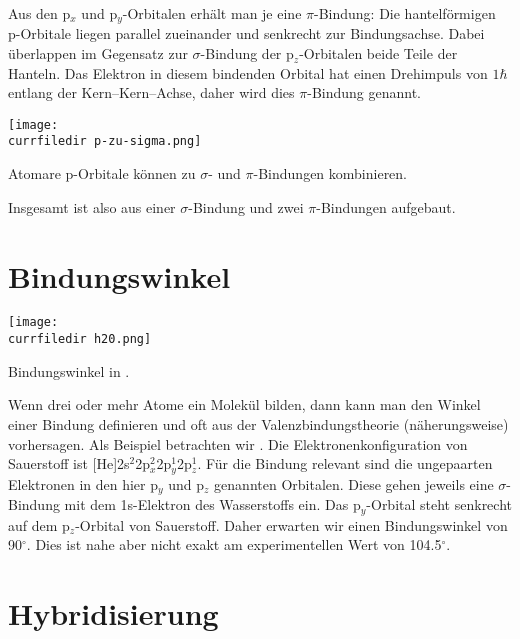 Aus den p$_x$ und p$_y$-Orbitalen erhält man je eine $\pi$-Bindung: Die hantelförmigen p-Orbitale liegen parallel zueinander und senkrecht zur Bindungsachse. Dabei überlappen im Gegensatz zur $\sigma$-Bindung der p$_z$-Orbitalen beide Teile der Hanteln. Das Elektron in diesem bindenden Orbital hat einen Drehimpuls von $1 \hbar$ entlang der Kern--Kern--Achse, daher wird dies $\pi$-Bindung genannt.

%
\begin{marginfigure}
\texttt{[image: \\currfiledir p-zu-sigma.png]}
\caption{Atomare p-Orbitale können zu $\sigma$- und $\pi$-Bindungen kombinieren. }
\end{marginfigure}
%

Insgesamt ist  also aus einer $\sigma$-Bindung und zwei $\pi$-Bindungen aufgebaut.


\section{Bindungswinkel}

%
\begin{marginfigure}
\texttt{[image: \\currfiledir h20.png]}
\caption{Bindungswinkel in  . }
\end{marginfigure}
%
Wenn drei oder mehr Atome ein Molekül bilden, dann kann man den Winkel einer Bindung definieren und oft aus der Valenzbindungstheorie (näherungsweise) vorhersagen. Als Beispiel betrachten wir . Die Elektronenkonfiguration von Sauerstoff ist [He]2s$^2$2p$_x^2$2p$_y^1$2p$_z^1$. Für die Bindung relevant sind die ungepaarten Elektronen in den hier p$_y$ und p$_z$ genannten Orbitalen. Diese gehen jeweils eine $\sigma$-Bindung mit dem 1s-Elektron des Wasserstoffs ein. Das p$_y$-Orbital steht senkrecht auf dem  p$_z$-Orbital von Sauerstoff. Daher erwarten wir einen Bindungswinkel von 90$^\circ$. Dies ist nahe aber nicht exakt am experimentellen Wert von 104.5$^\circ$.



\section{Hybridisierung}

